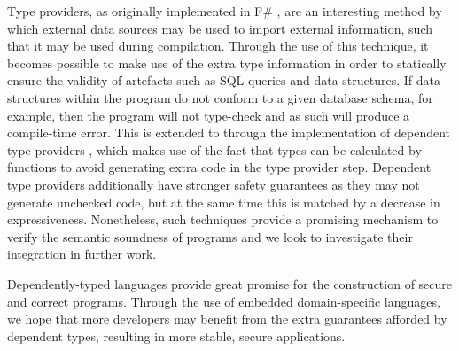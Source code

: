 Type providers, as originally implemented in F\# \cite{msr:tp}, are an interesting method by which external data sources may be used to import external information, such that it may be used during compilation. Through the use of this technique, it becomes possible to make use of the extra type information in order to statically ensure the validity of artefacts such as SQL queries and data structures. If data structures within the program do not conform to a given database schema, for example, then the program will not type-check and as such will produce a compile-time error. 
This is extended to \idris{} through the implementation of dependent type providers \cite{christiansen:dtp}, which makes use of the fact that types can be calculated by functions to avoid generating extra code in the type provider step. Dependent type providers additionally have stronger safety guarantees as they may not generate unchecked code, but at the same time this is matched by a decrease in expressiveness. Nonetheless, such techniques provide a promising mechanism to verify the semantic soundness of programs and we look to investigate their integration in further work.

Dependently-typed languages provide great promise for the construction of secure and correct programs. Through the use of embedded domain-specific languages, we hope that more developers may benefit from the extra guarantees afforded by dependent types, resulting in more stable, secure applications.

